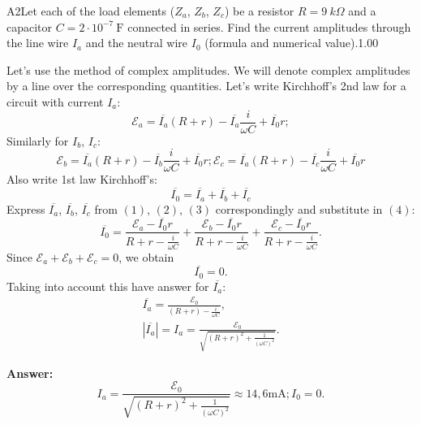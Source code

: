 \documentclass[11pt,a4paper]{article}
\begin{document}
\begin{solcard}{A2}{Let each of the load elements ($Z_a$, $Z_b$, $Z_c$) be a resistor $R = 9~k\Omega$ and a capacitor $C= 2 \cdot 10^{-7}~\text{F}$ connected in series.   Find the current amplitudes through the line wire $I_a$ and the neutral wire $I_0$ (formula and numerical value).}{1.00}

Let's use the method of complex amplitudes.  We will denote complex amplitudes by a line over the corresponding quantities. Let's write Kirchhoff's 2nd law for a circuit with current $I_a$: $$ \mathcal{E}_{a} = \overline{I_a}(R + r) - \overline{I_a}\frac{i}{\omega C} + \overline{I_0}r; $$ Similarly for $I_b$, $I_c$: \begin{equation} \mathcal{E}_{b} = \overline{I_a}(R + r) - \overline{I_b}\frac{i}{\omega C} + \overline{I_0}r;  \mathcal{E}_{c} = \overline{I_a}(R + r) - \overline{I_c}\frac{i}{\omega C} + \overline{I_0}r\end{equation} Also write 1st law Kirchhoff's: \begin{equation} \overline{I_0} = \overline{I_a} + \overline{I_b} + \overline{I_c}\end{equation} Express $\overline{I_a}$, $\overline{I_b}$, $\overline {I_c}$ from $(1)$, $(2)$, $(3)$ correspondingly and substitute in $(4)$: $$ \overline{I_0} = \frac{\mathcal{E}_{a} - \overline{I_0}r}{R+r - \frac{i}{\omega C}} + \frac{\mathcal{E}_{b} - \overline{I_0}r}{R+r - \frac{i}{\omega C}} + \frac{\mathcal{E}_{c} - \overline{I_0}r}{R+r - \frac{i}{\omega C}}.$$ Since $\mathcal{E}_{a} + \mathcal{E}_{b} + \mathcal{E}_{c} = 0$, we obtain $$ \overline{I_0} = 0. $$ Taking into account this have answer for $\overline{I_a}$: $$\begin{aligned} \overline{I_a} = \frac{\mathcal{E}_{0}}{\left(R + r \right) - \frac{i}{\omega C}}, \\
 |\overline{I_a}| = I_a =  \frac{\mathcal{E}_{0}}{\sqrt{\left(R + r \right)^2 + \frac{1}{(\omega C)^2}}}. \end{aligned}$$

\par\smallskip\noindent\textbf{Answer:} $$ I_a =  \frac{\mathcal{E}_{0}}{\sqrt{\left(R + r \right)^2 + \frac{1}{(\omega C)^2}}} \approx14{,}6\mathrm{mA};  I_0 = 0. $$
\end{solcard}
\end{document}
